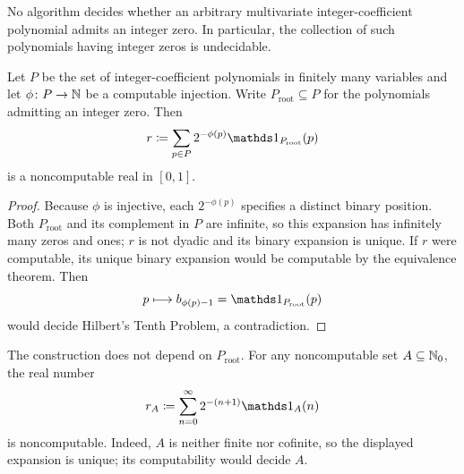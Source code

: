 \begin{fact}
No algorithm decides whether an arbitrary multivariate integer-coefficient
polynomial admits an integer zero. In particular, the collection of such
polynomials having integer zeros is undecidable.
\end{fact}

\begin{proposition}
Let $P$ be the set of integer-coefficient polynomials in finitely many
variables and let $\phi\colon P\to\mathbb{N}$ be a computable injection. Write
$P_{\mathrm{root}}\subseteq P$ for the polynomials admitting an integer zero.
Then
\[
 r\coloneqq\sum_{p\in P}2^{-\phi(p)}\indicator{P_{\mathrm{root}}}(p)
\]
is a noncomputable real in $[0, 1]$.
\end{proposition}
\begin{proof}
Because $\phi$ is injective, each $2^{-\phi(p)}$ specifies a distinct
binary position. Both $P_{\mathrm{root}}$ and its complement in $P$
are infinite, so this expansion has infinitely many zeros and ones;
$r$ is not dyadic and its binary expansion is unique.
If $r$ were computable, its unique binary expansion would be
computable by the equivalence theorem. Then
\[
 p\longmapsto b_{\phi(p)-1}=\indicator{P_{\mathrm{root}}}(p)
\]
would decide Hilbert's Tenth Problem, a contradiction.
\end{proof}

\begin{remark}
The construction does not depend on $P_{\mathrm{root}}$. For any
noncomputable set $A\subseteq\mathbb{N}_0$, the real number
\[
 r_A\coloneqq\sum_{n=0}^{\infty}2^{-(n+1)}\indicator{A}(n)
\]
is noncomputable. Indeed, $A$ is neither finite nor cofinite,
so the displayed expansion is unique; its computability would decide $A$.
\end{remark}
